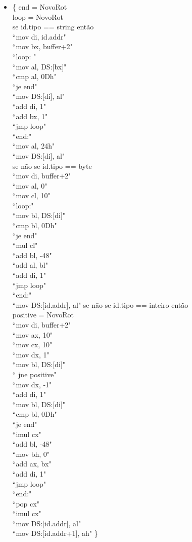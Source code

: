 \documentclass[fleqn]{article}
\newcommand*\circled[1]{\tikz[baseline=(char.base)]{
            \node[shape=circle,draw,inner sep=2pt] (char) {#1};}}
\begin{document}
\begin{itemize}
			\item \circled{37} \{ end = NovoRot \\ loop = NovoRot \\ se id.tipo == string então \\ ``mov di, id.addr" \\ ``mov bx, buffer+2" \\ ``loop: " \\ ``mov al, DS:[bx]" \\ ``cmp al, 0Dh" \\ ``je end" \\ ``mov DS:[di], al" \\ ``add di, 1" \\ ``add bx, 1" \\ ``jmp loop" \\ ``end:" \\ ``mov al, 24h" \\ ``mov DS:[di], al" \\ se não se id.tipo == byte \\ ``mov di, buffer+2" \\ ``mov al, 0" \\ ``mov cl, 10" \\ ``loop:" \\ ``mov bl, DS:[di]" \\ ``cmp bl, 0Dh" \\ ``je end" \\ ``mul cl" \\ ``add bl, -48" \\ ``add al, bl" \\ ``add di, 1" \\ ``jmp loop" \\ ``end:" \\ ``mov DS:[id.addr], al" se não se id.tipo == inteiro então \\ positive = NovoRot \\ ``mov di, buffer+2" \\ ``mov ax, 10" \\ ``mov cx, 10" \\ ``mov dx, 1" \\ ``mov bl, DS:[di]" \\ `` jne positive" \\ ``mov dx, -1" \\ ``add di, 1" \\ ``mov bl, DS:[di]" \\ ``cmp bl, 0Dh" \\ ``je end" \\ ``imul cx" \\ ``add bl, -48" \\ ``mov bh, 0" \\ ``add ax, bx" \\ ``add di, 1" \\ ``jmp loop" \\ ``end:" \\ ``pop cx" \\ ``imul cx" \\ ``mov DS:[id.addr], al" \\ ``mov DS:[id.addr+1], ah" \}
		\end{itemize}
\end{document}
